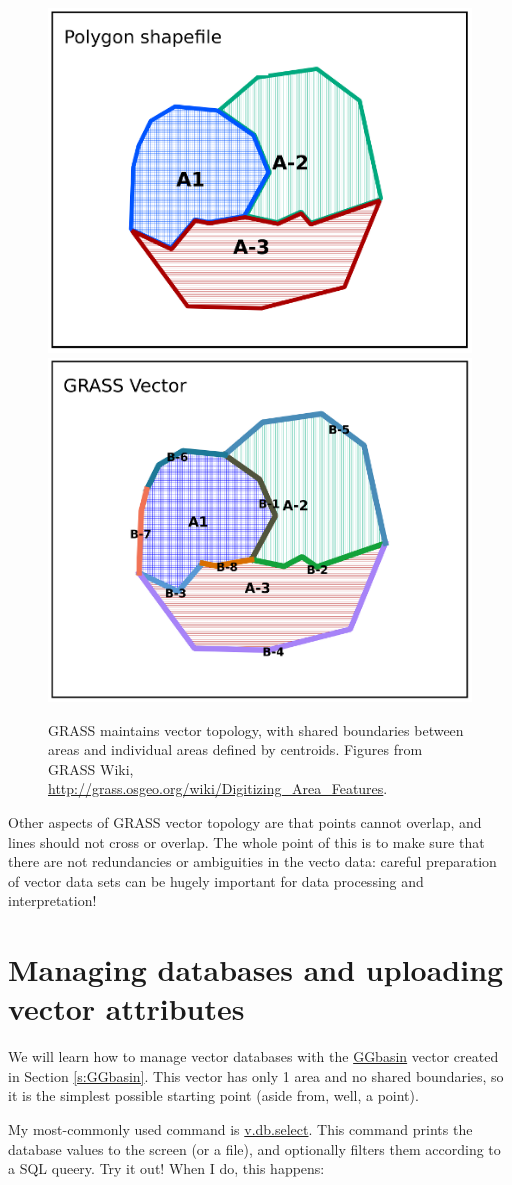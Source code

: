 \documentclass{book}
\begin{document}
\begin{figure}[h]
 \begin{center}
 \includegraphics[width=.45\linewidth]{figures/GRASSwiki/Shape.png}
 \includegraphics[width=.45\linewidth]{figures/GRASSwiki/Grass_vectors.png}
 \caption{GRASS maintains vector topology, with shared boundaries between areas and individual areas defined by centroids. Figures from GRASS Wiki, \protect\url{http://grass.osgeo.org/wiki/Digitizing_Area_Features}.}
 \label{fig:vector_paradigms}
 \end{center}
\end{figure}

Other aspects of GRASS vector topology are that points cannot overlap, and lines should not cross or overlap. The whole point of this is to make sure that there are not redundancies or ambiguities in the vecto data: careful preparation of vector data sets can be hugely important for data processing and interpretation!

\section{Managing databases and uploading vector attributes}

We will learn how to manage vector databases with the \url{GGbasin} vector created in Section \ref{s:GGbasin}. This vector has only 1 area and no shared boundaries, so it is the simplest possible starting point (aside from, well, a point).

My most-commonly used command is \url{v.db.select}. This command prints the database values to the screen (or a file), and optionally filters them according to a SQL queery. Try it out! When I do, this happens:
\end{document}
